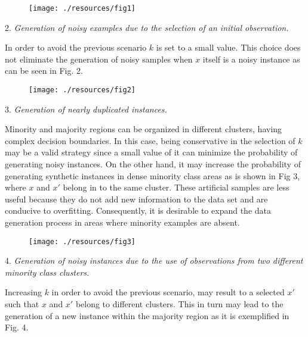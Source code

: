 \documentclass[parskip=full]{scrartcl}
\begin{document}
\begin{figure}[H]
	\centering
	\texttt{[image: ./resources/fig1]}
\end{figure}

2. \textit{Generation of noisy examples due to the selection of an initial
observation.}

In order to avoid the previous scenario \( k \) is set to a small value. This
choice does not eliminate the generation of noisy samples when \( x \) itself is
a noisy instance as can be seen in Fig. 2.

\begin{figure}[H]
	\centering
	\texttt{[image: ./resources/fig2]}
\end{figure}

3. \textit{Generation of nearly duplicated instances.}

Minority and majority regions can be organized in different clusters, having
complex decision boundaries.  In this case, being conservative in the selection
of \( k \) may be a valid strategy since a small value of it can minimize the
probability of generating noisy instances. On the other hand, it may increase
the probability of generating synthetic instances in dense minority class areas
as is shown in Fig 3, where \(x\) and \(x'\) belong in to the same cluster.
These artificial samples are less useful because they do not add new information
to the data set and are conducive to overfitting. Consequently, it is desirable
to expand the data generation process in areas where minority examples are
absent.

\begin{figure}[H]
	\centering
	\texttt{[image: ./resources/fig3]}
	\end{figure}

4. \textit{Generation of noisy instances due to the use of observations from two
different minority class clusters.}

Increasing \( k \)  in order to avoid the previous scenario,  may result to a
selected \( x' \) such that \( x \) and \( x' \) belong to different clusters.
This in turn may lead to the generation of a new instance within the majority
region as it is exemplified in Fig. 4. 
\end{document}
